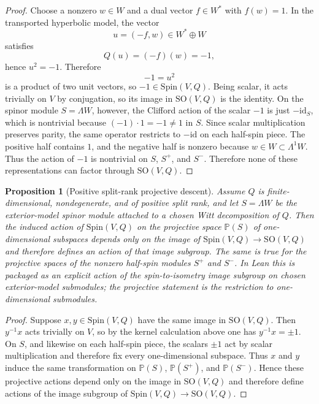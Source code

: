 \documentclass{birkjour}
\theoremstyle{plain}
\newtheorem{proposition}[theorem]{Proposition}
\theoremstyle{definition}
\theoremstyle{remark}
\newcommand{\Spin}{\mathrm{Spin}}
\newcommand{\SO}{\mathrm{SO}}
\newcommand{\wedgeW}{\Lambda W}
\begin{document}
\begin{proof}
Choose a nonzero $w\in W$ and a dual vector $f\in W^*$ with $f(w)=1$. In the
transported hyperbolic model, the vector
\[
  u=(-f,w)\in W^*\oplus W
\]
satisfies
\[
  Q(u)=(-f)(w)=-1,
\]
hence $u^2=-1$. Therefore
\[
  -1=u^2
\]
is a product of two unit vectors, so $-1\in \Spin(V,Q)$. Being scalar, it acts
trivially on $V$ by conjugation, so its image in $\SO(V,Q)$ is the identity.
On the spinor module $S=\wedgeW$, however, the Clifford action of the
scalar $-1$ is just $-\mathrm{id}_S$, which is nontrivial because
$(-1)\cdot 1=-1\neq 1$ in $S$. Since scalar multiplication preserves parity,
the same operator restricts to $-\mathrm{id}$ on each half-spin piece. The
positive half contains $1$, and the negative half is nonzero because
$w\in W\subset \Lambda^1 W$. Thus the action of $-1$ is nontrivial on $S$,
$S^+$, and $S^-$. Therefore none of these representations can factor through
$\SO(V,Q)$.
\end{proof}

\begin{proposition}[Positive split-rank projective descent]
\label{prop:projective-descent}
Assume $Q$ is finite-dimensional, nondegenerate, and of positive split rank,
and let $S=\wedgeW$ be the exterior-model spinor module attached to a
chosen Witt decomposition of $Q$. Then the induced action of $\Spin(V,Q)$ on
the projective space $\mathbb{P}(S)$ of one-dimensional subspaces depends only
on the image of $\Spin(V,Q)\to\SO(V,Q)$ and therefore defines an action of
that image subgroup. The same is true for the projective spaces of the nonzero
half-spin modules $S^+$ and $S^-$. In Lean this is packaged as an explicit
action of the spin-to-isometry image subgroup on chosen exterior-model submodules; the
projective statement is the restriction to one-dimensional submodules.
\end{proposition}

\begin{proof}
Suppose $x,y\in \Spin(V,Q)$ have the same image in $\SO(V,Q)$. Then
$y^{-1}x$ acts trivially on $V$, so by the kernel calculation above one has
$y^{-1}x=\pm1$. On $S$, and likewise on each half-spin piece, the scalars
$\pm1$ act by scalar multiplication and therefore fix every one-dimensional
subspace. Thus $x$ and $y$ induce the same transformation on
$\mathbb{P}(S)$, $\mathbb{P}(S^+)$, and $\mathbb{P}(S^-)$. Hence these
projective actions depend only on the image in $\SO(V,Q)$ and therefore define
actions of the image subgroup of $\Spin(V,Q)\to\SO(V,Q)$.
\end{proof}
\end{document}
